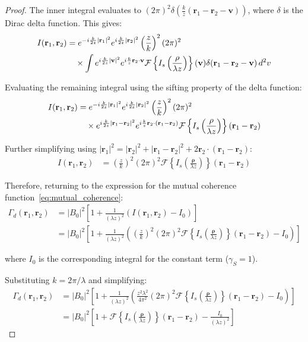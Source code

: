\documentclass[a4paper,12pt]{article}
\begin{document}
\begin{proof}
The inner integral evaluates to $(2\pi)^2 \delta(\frac{k}{z}(\mathbf{r}_1-\mathbf{r}_2-\mathbf{v}))$, where $\delta$ is 
the Dirac delta function. This gives:
\begin{align}
I(\mathbf{r}_1, \mathbf{r}_2) &= e^{-i\frac{k}{2z}|\mathbf{r}_1|^2} e^{i\frac{k}{2z}|\mathbf{r}_2|^2} \left(\frac{z}{k}\right)^2 (2\pi)^2 \\
&\quad \times \int e^{i\frac{k}{2z}|\mathbf{v}|^2} e^{i\frac{k}{z}\mathbf{r}_2 \cdot \mathbf{v}} \mathcal{F}\left\{I_s\left(\frac{\mathbf{\rho}}{\lambda z}\right)\right\}(\mathbf{v}) \delta(\mathbf{r}_1-\mathbf{r}_2-\mathbf{v}) \, d^2v \notag
\end{align}

Evaluating the remaining integral using the sifting property of the delta function:
\begin{align}
I(\mathbf{r}_1, \mathbf{r}_2) &= e^{-i\frac{k}{2z}|\mathbf{r}_1|^2} e^{i\frac{k}{2z}|\mathbf{r}_2|^2} \left(\frac{z}{k}\right)^2 (2\pi)^2 \\
&\quad \times e^{i\frac{k}{2z}|\mathbf{r}_1-\mathbf{r}_2|^2} e^{i\frac{k}{z}\mathbf{r}_2 \cdot (\mathbf{r}_1-\mathbf{r}_2)} \mathcal{F}\left\{I_s\left(\frac{\mathbf{\rho}}{\lambda z}\right)\right\}(\mathbf{r}_1-\mathbf{r}_2) \notag
\end{align}

Further simplifying using $|\mathbf{r}_1|^2 = |\mathbf{r}_2|^2 + |\mathbf{r}_1-\mathbf{r}_2|^2 + 2\mathbf{r}_2 \cdot (\mathbf{r}_1-\mathbf{r}_2)$:
\begin{align}
I(\mathbf{r}_1, \mathbf{r}_2) &= \left(\frac{z}{k}\right)^2 (2\pi)^2 \mathcal{F}\left\{I_s\left(\frac{\mathbf{\rho}}{\lambda z}\right)\right\}(\mathbf{r}_1-\mathbf{r}_2)
\end{align}

Therefore, returning to the expression for the mutual coherence function~\ref{eq:mutual_coherence}:
\begin{align}
\Gamma_d(\mathbf{r}_1, \mathbf{r}_2) &= |B_0|^2 \left[1 + \frac{1}{(\lambda z)^2} \left(I(\mathbf{r}_1, \mathbf{r}_2) - I_0\right)\right] \\
&= |B_0|^2 \left[1 + \frac{1}{(\lambda z)^2} \left(\left(\frac{z}{k}\right)^2 (2\pi)^2 \mathcal{F}\left\{I_s\left(\frac{\mathbf{\rho}}{\lambda z}\right)\right\}(\mathbf{r}_1-\mathbf{r}_2) - I_0\right)\right]
\end{align}

where $I_0$ is the corresponding integral for the constant term ($\gamma_S = 1$).

Substituting $k = 2\pi/\lambda$ and simplifying:
\begin{align}
\Gamma_d(\mathbf{r}_1, \mathbf{r}_2) &= |B_0|^2 \left[1 + \frac{1}{(\lambda z)^2} \left(\frac{z^2 \lambda^2}{4\pi^2} (2\pi)^2 \mathcal{F}\left\{I_s\left(\frac{\mathbf{\rho}}{\lambda z}\right)\right\}(\mathbf{r}_1-\mathbf{r}_2) - I_0\right)\right] \\
&= |B_0|^2 \left[1 + \mathcal{F}\left\{I_s\left(\frac{\mathbf{\rho}}{\lambda z}\right)\right\}(\mathbf{r}_1-\mathbf{r}_2) - \frac{I_0}{(\lambda z)^2}\right]
\end{align}


\end{proof}
\end{document}
